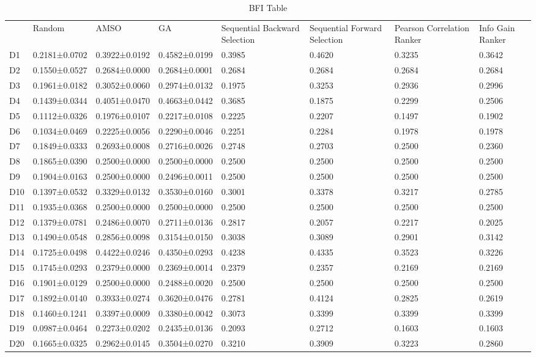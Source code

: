 \begin{table*}[h]
\caption{BFI Table}
\label{tbl:bfi}\begin{tabular}{llllllll}
\noalign{\smallskip}\hline\noalign{\smallskip}
&Random&AMSO&GA&Sequential Backward Selection&Sequential Forward Selection&Pearson Correlation Ranker&Info Gain Ranker\\\noalign{\smallskip}\hline
D1&0.2181±0.0702&0.3922±0.0192&0.4582±0.0199&0.3985&0.4620&0.3235&0.3642\\
D2&0.1550±0.0527&0.2684±0.0000&0.2684±0.0001&0.2684&0.2684&0.2684&0.2684\\
D3&0.1961±0.0182&0.3052±0.0060&0.2974±0.0132&0.1975&0.3253&0.2936&0.2996\\
D4&0.1439±0.0344&0.4051±0.0470&0.4663±0.0442&0.3685&0.1875&0.2299&0.2506\\
D5&0.1112±0.0326&0.1976±0.0107&0.2217±0.0108&0.2225&0.2207&0.1497&0.1902\\
D6&0.1034±0.0469&0.2225±0.0056&0.2290±0.0046&0.2251&0.2284&0.1978&0.1978\\
D7&0.1849±0.0333&0.2693±0.0008&0.2716±0.0026&0.2748&0.2703&0.2500&0.2360\\
D8&0.1865±0.0390&0.2500±0.0000&0.2500±0.0000&0.2500&0.2500&0.2500&0.2500\\
D9&0.1904±0.0163&0.2500±0.0000&0.2496±0.0011&0.2500&0.2500&0.2500&0.2500\\
D10&0.1397±0.0532&0.3329±0.0132&0.3530±0.0160&0.3001&0.3378&0.3217&0.2785\\
D11&0.1935±0.0368&0.2500±0.0000&0.2500±0.0000&0.2500&0.2500&0.2500&0.2500\\
D12&0.1379±0.0781&0.2486±0.0070&0.2711±0.0136&0.2817&0.2057&0.2217&0.2025\\
D13&0.1490±0.0548&0.2856±0.0098&0.3154±0.0150&0.3038&0.3089&0.2901&0.3142\\
D14&0.1725±0.0498&0.4422±0.0246&0.4350±0.0293&0.4238&0.4335&0.3523&0.3226\\
D15&0.1745±0.0293&0.2379±0.0000&0.2369±0.0014&0.2379&0.2357&0.2169&0.2169\\
D16&0.1901±0.0129&0.2500±0.0000&0.2488±0.0020&0.2500&0.2500&0.2500&0.2500\\
D17&0.1892±0.0140&0.3933±0.0274&0.3620±0.0476&0.2781&0.4124&0.2825&0.2619\\
D18&0.1460±0.1241&0.3397±0.0009&0.3380±0.0042&0.3073&0.3399&0.3399&0.3399\\
D19&0.0987±0.0464&0.2273±0.0202&0.2435±0.0136&0.2093&0.2712&0.1603&0.1603\\
D20&0.1665±0.0325&0.2962±0.0145&0.3504±0.0270&0.3210&0.3909&0.3223&0.2860\\

\end{tabular}
\end{table*}
